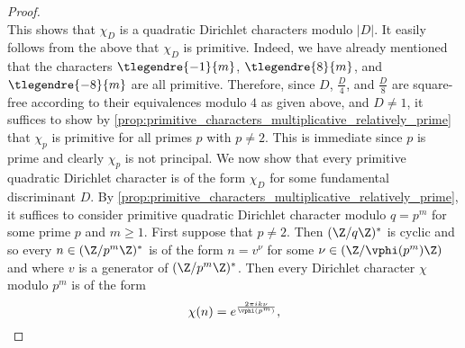 \begin{proof}
\[        \]
        This shows that $\chi_{D}$ is a quadratic Dirichlet characters modulo $|D|$. It easily follows from the above that $\chi_{D}$ is primitive. Indeed, we have already mentioned that the characters $\tlegendre{-1}{m}$, $\tlegendre{8}{m}$, and $\tlegendre{-8}{m}$ are all primitive. Therefore, since $D$, $\frac{D}{4}$, and $\frac{D}{8}$ are square-free according to their equivalences modulo $4$ as given above, and $D \neq 1$, it suffices to show by \cref{prop:primitive_characters_multiplicative_relatively_prime} that $\chi_{p}$ is primitive for all primes $p$ with $p \neq 2$. This is immediate since $p$ is prime and clearly $\chi_{p}$ is not principal. We now show that every primitive quadratic Dirichlet character is of the form $\chi_{D}$ for some fundamental discriminant $D$. By \cref{prop:primitive_characters_multiplicative_relatively_prime}, it suffices to consider primitive quadratic Dirichlet character modulo $q = p^{m}$ for some prime $p$ and $m \ge 1$. First suppose that $p \neq 2$. Then $(\Z/q\Z)^{\ast}$ is cyclic and so every $n \in (\Z/p^{m}\Z)^{\ast}$ is of the form $n = v^{\nu}$ for some $\nu \in (\Z/\vphi(p^{m})\Z)$ and where $v$ is a generator of $(\Z/p^{m}\Z)^{\ast}$. Then every Dirichlet character $\chi$ modulo $p^{m}$ is of the form
        \[
          \chi(n) = e^{\frac{2\pi ik\nu}{\vphi(p^{m})}},
        \]

\end{proof}
